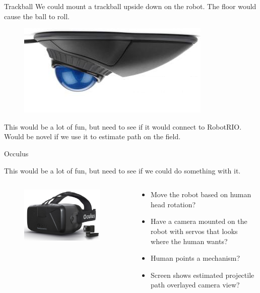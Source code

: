 \documentclass{beamer}
\begin{document}
\begin{frame}[shrink]{Trackball}
We could mount a trackball upside down on the robot.  The floor would cause the 
ball to roll.

\begin{figure}
\centering
\includegraphics[width=\textwidth]{Trackball}
\end{figure}
This would be a lot of fun, but need to see if it would connect to RobotRIO.
Would be novel if we use it to estimate path on the field.
\end{frame}

\begin{frame}[shrink]{Occulus}

This would be a lot of fun, but need to see if we could do something with it.  
\begin{columns}
\begin{column}{0.5\textwidth}
\begin{figure}
\centering
\includegraphics[width=0.9\textwidth]{Occulus}
\end{figure}
\end{column}
\begin{column}{0.5\textwidth}
\begin{itemize}
\item Move the robot based on human head rotation?  
\item Have a camera mounted on the robot with servos that looks where the human 
wants?
\item Human points a mechanism?  
\item Screen shows estimated projectile path 
overlayed camera view?
\end{itemize}
\end{column}
\end{columns}
\end{frame}
\end{document}
